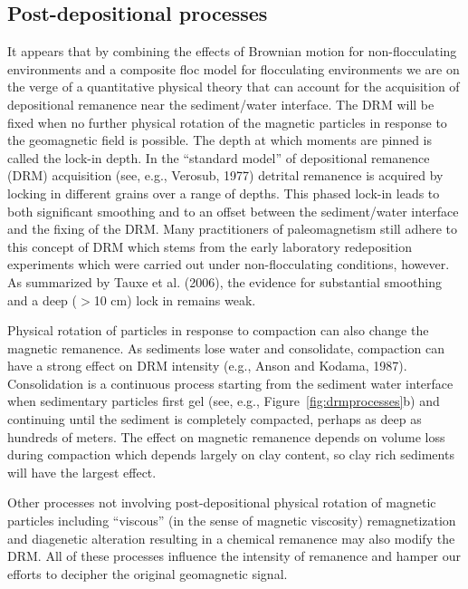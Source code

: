 \subsection{Post-depositional processes}

It appears that by combining the effects of Brownian motion for non-flocculating environments and a composite floc model for flocculating environments  we are on the verge of a quantitative physical theory that can account for the acquisition of depositional remanence near the sediment/water interface.  The DRM will be fixed when no further physical rotation of the magnetic particles in response to the geomagnetic field is possible.  The depth at which moments are pinned is called the lock-in depth.    In the ``standard model'' of depositional  remanence (DRM) acquisition (see, e.g., 
 \nocite{verosub77} 
 Verosub, 1977) detrital remanence is acquired by locking in different grains over a range of depths.  This phased lock-in  leads to  both  significant smoothing and to an offset between the sediment/water interface and the fixing of the DRM.   Many practitioners of paleomagnetism still adhere to this concept of DRM which stems from the early laboratory redeposition experiments which were carried out under non-flocculating conditions, however.    As summarized by 
 \nocite{tauxe06}
 Tauxe et al. (2006), the evidence for substantial smoothing and a deep ($>$10 cm)  lock in remains weak.  



Physical rotation of particles in response to compaction can also change the magnetic remanence.    
As sediments lose water and consolidate, compaction can have a strong effect on DRM intensity (e.g., \nocite{anson87} 
Anson and Kodama, 1987).    Consolidation is a continuous process starting from the sediment water interface when sedimentary particles first gel (see, e.g., Figure~\ref{fig:drmprocesses}b) and continuing until the sediment is completely compacted, perhaps as deep as hundreds of meters.     The effect on magnetic remanence depends on volume loss during compaction which depends largely on clay content, so clay rich sediments will have the largest effect.     

Other processes not involving post-depositional physical rotation of magnetic particles including ``viscous'' (in the sense of magnetic viscosity) remagnetization and diagenetic alteration resulting in a chemical remanence may also modify the DRM.  All of these processes influence the  intensity of remanence and hamper our efforts to decipher  the original geomagnetic  signal.    


